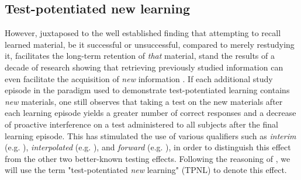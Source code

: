 \documentclass[../main.tex]{subfiles}
\begin{document}
\subsection*{Test-potentiated new learning}

However, juxtaposed to the well established finding that attempting to recall learned material, be it successful or unsuccessful, compared to merely restudying it, facilitates the long-term retention of \textit{that} material, stand the results of a decade of research showing that retrieving previously studied information can even facilitate the acquisition of \textit{new} information \citep{chanRetrievalPotentiatesNew2018, yangEnhancingLearningRetrieval2018}. If each additional study episode in the paradigm used to demonstrate test-potentiated learning contains \textit{new} materials, one still observes that taking a test on the new materials after each learning episode yields a greater number of correct responses and a decrease of proactive interference on a test administered to all subjects after the final learning episode. This has stimulated the use of various qualifiers such as \textit{interim} (e.g. \citealp{wissmanInterimTestEffect2011}), \textit{interpolated} (e.g. \citealp{szpunarInterpolatedMemoryTests2013}), and \textit{forward} (e.g.  \citealp{pastotterRetrievalPracticeEnhances2014,yangEnhancingLearningRetrieval2018}), in order to distinguish this effect from the other two better-known testing effects. Following the reasoning of \cite{chanRetrievalPotentiatesNew2018}, we will use the term "test-potentiated \textit{new} learning" (TPNL) to denote this effect.
\end{document}

